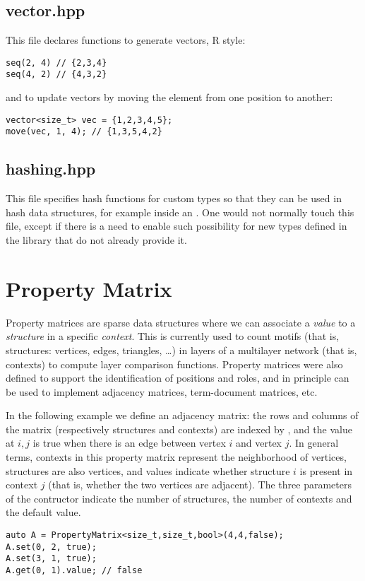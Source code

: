 \subsection{vector.hpp}

This file declares functions to generate vectors, R style:
\begin{lstlisting}[style=c++]
seq(2, 4) // {2,3,4}
seq(4, 2) // {4,3,2}
\end{lstlisting}
and to update vectors by moving the element from one position to another:
\begin{lstlisting}[style=c++]
vector<size_t> vec = {1,2,3,4,5};
move(vec, 1, 4); // {1,3,5,4,2}
\end{lstlisting}
    

\subsection{hashing.hpp}

This file specifies hash functions for custom types so that they can be used in hash data structures, for example inside an . One would not normally touch this file, except if there is a need to enable such possibility for new types defined in the library that do not already provide it.

\section{Property Matrix}

Property matrices are sparse data structures where we can associate a \emph{value} to a \emph{structure} in a specific \emph{context}. This is currently used to count motifs (that is, structures: vertices, edges, triangles, \dots) in layers of a multilayer network (that is, contexts) to compute layer comparison functions. Property matrices were also defined to support the identification of positions and roles, and in principle can be used to implement adjacency matrices, term-document matrices, etc.

In the following example we define an adjacency matrix: the rows and columns of the matrix (respectively structures and contexts) are indexed by , and the value at $i,j$ is true when there is an edge between vertex $i$ and vertex $j$. In general terms, contexts in this property matrix represent the neighborhood of vertices, structures are also vertices, and values indicate whether structure $i$ is present in context $j$ (that is, whether the two vertices are adjacent). The three parameters of the contructor indicate the number of structures, the number of contexts and the default value.
\begin{lstlisting}[style=c++]
auto A = PropertyMatrix<size_t,size_t,bool>(4,4,false);
A.set(0, 2, true);
A.set(3, 1, true);
A.get(0, 1).value; // false
\end{lstlisting}

